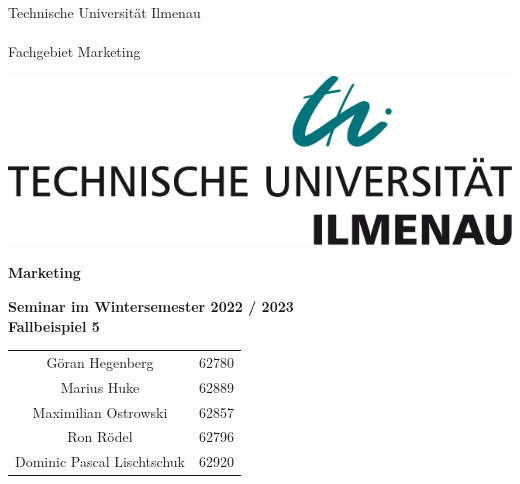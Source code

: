 \begin{titlepage}
    
    \begin{minipage}[b]{0.625\textwidth}
      Technische Universität Ilmenau\\
      \\
      Fachgebiet Marketing
    \end{minipage}%
    \hfill
    \begin{minipage}[b]{0.375\textwidth}
      \begin{flushright}
        \includegraphics[width=\textwidth]{tu_logo.jpg}
      \end{flushright}
    \end{minipage}
    \vspace*{12\baselineskip}
    
    \begin{centering}
    {\huge \textbf{Marketing}}\\
    \vspace*{1\baselineskip}
    
    {\large \textbf{Seminar im Wintersemester 2022 / 2023}}\\
    \vspace*{9\baselineskip}
    {\LARGE \textbf{Fallbeispiel 5}}\\
    \vspace*{1\baselineskip}
    
    \begin{center}
        \large
        \begin{tabular}{cc}
            Göran Hegenberg & 62780\\
            Marius Huke & 62889\\
            Maximilian Ostrowski & 62857\\
            Ron Rödel & 62796\\
            Dominic Pascal Lischtschuk & 62920\\
        \end{tabular}
    \end{center}
    \end{centering}
    
    \restoregeometry
    \end{titlepage}
    
    
    
    \tableofcontents
    \thispagestyle{empty} %
    \pagebreak %